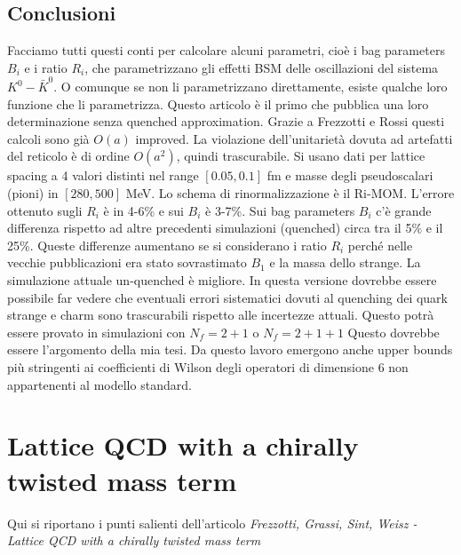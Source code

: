 \documentclass[12pt,a4paper,openright]{article}
\newcommand{\colg}{\textcolor{PineGreen}}
\newcommand{\colr}{\textcolor{BrickRed}}
\begin{document}
\subsection{Conclusioni}
Facciamo tutti questi conti per calcolare alcuni parametri, cioè i bag parameters $B_i$ e i ratio $R_i$, che parametrizzano gli effetti BSM delle oscillazioni del sistema $K^0 - \bar K^0$.
O comunque se non li parametrizzano direttamente, esiste qualche loro funzione che li parametrizza.
Questo articolo è il primo che pubblica una loro determinazione senza quenched approximation.
Grazie a Frezzotti e Rossi questi calcoli sono già $O(a)$ improved.
La violazione dell'unitarietà dovuta ad artefatti del reticolo è di ordine $O(a^2)$, quindi trascurabile.
\newline
Si usano dati per lattice spacing a 4 valori distinti nel range $[0.05, 0.1]$ fm e masse degli pseudoscalari (pioni) in $[280, 500]$ MeV.
Lo schema di rinormalizzazione è il Ri-MOM.
L'errore ottenuto sugli $R_i$ è in 4-6\% e sui $B_i$ è 3-7\%.
\newline
\colg{Sui bag parameters $B_i$ c'è grande differenza rispetto ad altre precedenti simulazioni (quenched) circa tra il 5\% e il 25\%.
Queste differenze aumentano se si considerano i ratio $R_i$ perché nelle vecchie pubblicazioni era stato sovrastimato $B_1$ e la massa dello strange.
La simulazione attuale un-quenched è migliore.
In questa versione dovrebbe essere possibile far vedere che eventuali errori sistematici dovuti al quenching dei quark strange e charm sono trascurabili rispetto alle incertezze attuali.
Questo potrà essere provato in simulazioni con $N_f = 2+1$ o $N_f = 2+1+1$}
\colr{Questo dovrebbe essere l'argomento della mia tesi.}
\newline
Da questo lavoro emergono anche upper bounds più stringenti ai coefficienti di Wilson degli operatori di dimensione 6 non appartenenti al modello standard.


%

\newpage

\section{Lattice QCD with a chirally twisted mass term}
Qui si riportano i punti salienti dell'articolo \textit{Frezzotti, Grassi, Sint, Weisz - Lattice QCD with a chirally twisted mass term}
\end{document}

